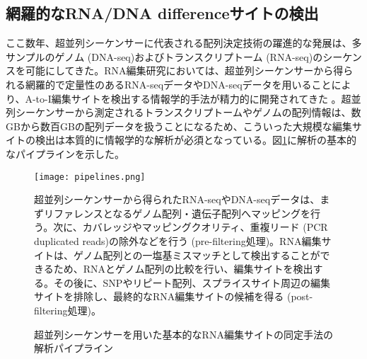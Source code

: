 \subsection{網羅的なRNA/DNA differenceサイトの検出}
ここ数年、超並列シーケンサーに代表される配列決定技術の躍進的な発展は、多サンプルのゲノム (DNA-seq)およびトランスクリプトーム (RNA-seq)のシーケンスを可能にしてきた。RNA編集研究においては、超並列シーケンサーから得られる網羅的で定量性のあるRNA-seqデータやDNA-seqデータを用いることにより、A-to-I編集サイトを検出する情報学的手法が精力的に開発されてきた \citep{pmid21596952, Ramaswami:2012aa, Zhu:2013aa, St-Laurent:2013aa, DilHauGib1304, RamZhaPis1302, Bazak:2013aa, Sakurai:2014aa, Pinto:2014aa, Rodriguez:2012aa, Park:2012aa, Peng:2012aa, Kleinman:2012aa, LagHorMar1304, Che1307, BahLeeLi1201}。超並列シーケンサーから測定されるトランスクリプトームやゲノムの配列情報は、数GBから数百GBの配列データを扱うことになるため、こういった大規模な編集サイトの検出は本質的に情報学的な解析が必須となっている。図\ref{fig:pipelines}に解析の基本的なパイプラインを示した。

\begin{figure}[!h]
	\begin{center}
		\texttt{[image: pipelines.png]}
	\end{center}
	\caption{超並列シーケンサーを用いた基本的なRNA編集サイトの同定手法の解析パイプライン}
	\begin{flushleft}
		\small{超並列シーケンサーから得られたRNA-seqやDNA-seqデータは、まずリファレンスとなるゲノム配列・遺伝子配列へマッピングを行う。次に、カバレッジやマッピングクオリティ、重複リード (PCR duplicated reads)の除外などを行う (pre-filtering処理)。RNA編集サイトは、ゲノム配列との一塩基ミスマッチとして検出することができるため、RNAとゲノム配列の比較を行い、編集サイトを検出する。その後に、SNPやリピート配列、スプライスサイト周辺の編集サイトを排除し、最終的なRNA編集サイトの候補を得る (post-filtering処理)。}
	\end{flushleft}
	\label{fig:pipelines}
\end{figure}

